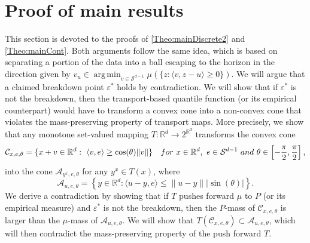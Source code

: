 \documentclass[11pt]{article}
\DeclareMathOperator*{\argmin}{arg\,min}
\newcommand{\R}{\mathbb{R}}
\theoremstyle{plain}
\theoremstyle{definition}
\begin{document}
\section{Proof of main results}\label{Sect:proofs}
This section is devoted to the proofs of \autoref{Theo:mainDiscrete2} and \autoref{Theo:mainCont}. Both arguments follow the same idea, which is based on separating a portion of the data into a ball escaping to the horizon  in the direction given by $v_{u}\in\argmin_{v\in \mathcal{S}^{d-1}} \mu\left( \{z: \langle v, z - u \rangle \geq 0\} \right) $. We will argue that a claimed breakdown point $\varepsilon^*$ holds by contradiction. We will show that if $\varepsilon^*$ is not the breakdown, then the transport-based quantile function (or its empirical counterpart) would have to transform a convex cone into a non-convex cone that violates the mass-preserving property of transport maps. More precisely, we show that  any monotone set-valued mapping $T:\R^d\to 2^{\R^d}$  transforms the convex cone
%
\begin{equation}
    \label{eq:convexcone}
    \mathcal{C}_{x,e, \theta} =\{ x+v\in \R^d: \ \langle v, e\rangle \geq \cos(\theta) \|v\|\} \quad  {{\rm for}\  x\in \R^d, \ e\in \mathcal{S}^{d-1}\ {\rm and}\  \theta\in \left[-\frac{\pi}{2}, \frac{\pi}{2}\right],} 
\end{equation}
 {into the cone $ \mathcal{A}_{y^x,e, \theta} $ for any $y^x\in T(x)$, where }
\begin{equation}
    \label{eq:cone-def-nonconvex}
    \mathcal{A}_{u,e, \theta} =\left\{y\in \R^d: \langle u-y, e\rangle\leq 
 \| u-y\|  {|\sin(\theta)|}   \right\}. 
\end{equation}
We derive a contradiction by showing that if $T$ pushes forward  $\mu$
to $P$ (or its empirical measure) and $\varepsilon^*$ is not the breakdown, then the $P$-mass of  $\mathcal{C}_{x,e, \theta}$ is larger than the $\mu$-mass of $ \mathcal{A}_{u,e, \theta}$.  {We will show that $T(\mathcal{C}_{x,e, \theta})\subset \mathcal{A}_{u,e, \theta}$, which will then contradict the mass-preserving property of the push forward $T$.}
%
\end{document}
